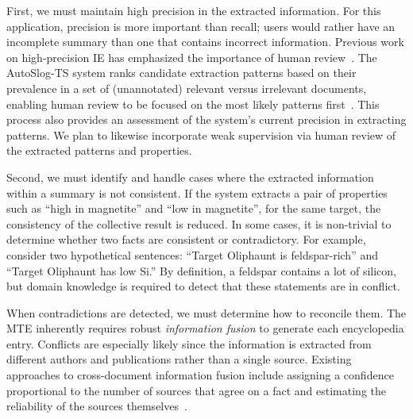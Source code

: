 \documentclass[letterpaper]{article}
\begin{document}
First, we 
must maintain high precision in the extracted information.
For this application, precision is more important than recall; users
would rather have an incomplete summary than one that contains
incorrect information. 
Previous work on high-precision IE has emphasized the importance of
human review~\cite{caruana:hpie00}.  The AutoSlog-TS system 
ranks candidate extraction patterns based on their
prevalence in a set of (unannotated) relevant versus irrelevant
documents, enabling human review to be focused on the most likely
patterns first~\cite{riloff:autoslog96}.
This process also provides an assessment of the system's current
precision in extracting patterns.
We plan to likewise incorporate weak supervision via human review of
the extracted patterns and properties.

Second, we must identify and handle cases where the extracted
information within a summary is not consistent.  If the system
extracts a pair of properties such as ``high in magnetite'' and ``low
in magnetite'', for the same target, the consistency of the collective
result is reduced.
%
In some cases, it is non-trivial to determine whether two facts are
consistent or contradictory.  For example, consider two hypothetical
sentences: ``Target Oliphaunt is feldspar-rich'' and ``Target Oliphaunt has
low Si.''  By definition, a feldspar contains a lot of silicon, but
domain knowledge is required to detect that these statements are in
conflict.  

When contradictions are detected, we must determine how to reconcile
them.  The MTE inherently requires robust {\em information fusion} to
generate each encyclopedia entry.  Conflicts are especially likely
since the information is extracted from different authors and
publications rather than a single source.  Existing approaches to
cross-document information fusion include assigning a confidence
proportional to the number of sources that agree on a fact and
estimating the reliability of the sources
themselves~\cite{ji:infofusion10}.
\end{document}
